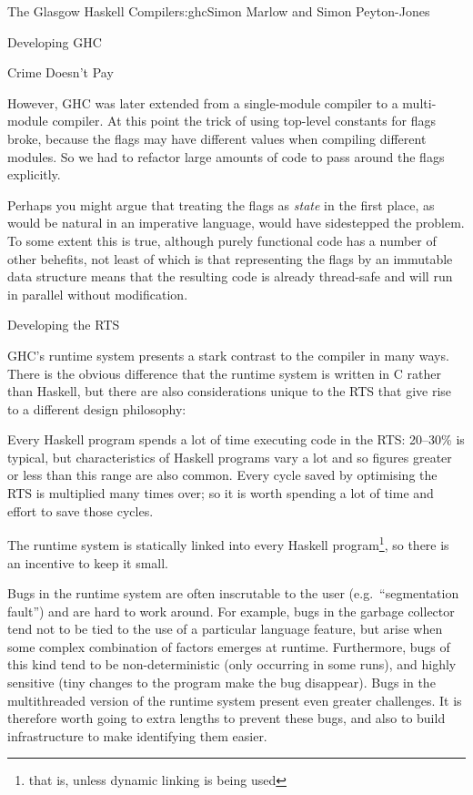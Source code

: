 \begin{aosachapter}{The Glasgow Haskell Compiler}{s:ghc}{Simon Marlow and Simon Peyton-Jones}
\begin{aosasect1}{Developing GHC}
\begin{aosasect2}{Crime Doesn't Pay}
\begin{aosaitemize}
  However, GHC was later extended from a single-module compiler to a
  multi-module compiler.  At this point the trick of using top-level
  constants for flags broke, because the flags may have different
  values when compiling different modules.  So we had to refactor
  large amounts of code to pass around the flags explicitly.

  Perhaps you might argue that treating the flags as \emph{state} in
  the first place, as would be natural in an imperative language,
  would have sidestepped the problem.  To some extent this is true,
  although purely functional code has a number of other behefits, not
  least of which is that representing the flags by an immutable data
  structure means that the resulting code is already thread-safe and
  will run in parallel without modification.

\end{aosaitemize}

\end{aosasect2}

\begin{aosasect2}{Developing the RTS}

GHC's runtime system presents a stark contrast to the compiler in many
ways.  There is the obvious difference that the runtime system is
written in C rather than Haskell, but there are also considerations
unique to the RTS that give rise to a different design philosophy:

\begin{aosaenumerate}

\item Every Haskell program spends a lot of time executing code in the
  RTS: 20--30\% is typical, but characteristics of Haskell programs
  vary a lot and so figures greater or less than this range are also
  common.  Every cycle saved by optimising the RTS is multiplied many
  times over; so it is worth spending a lot of time and effort to save
  those cycles.

\item The runtime system is statically linked into every Haskell
  program\footnote{that is, unless dynamic linking is being used}, so
  there is an incentive to keep it small.

\item Bugs in the runtime system are often inscrutable to the user
  (e.g.\ ``segmentation fault'') and are hard to work around.  For
  example, bugs in the garbage collector tend not to be tied to the
  use of a particular language feature, but arise when some complex
  combination of factors emerges at runtime.  Furthermore, bugs of
  this kind tend to be non-deterministic (only occurring in some
  runs), and highly sensitive (tiny changes to the program make the
  bug disappear).  Bugs in the multithreaded version of the runtime
  system present even greater challenges.  It is therefore worth going
  to extra lengths to prevent these bugs, and also to build
  infrastructure to make identifying them easier.


\end{aosaenumerate}
\end{aosasect2}
\end{aosasect1}
\end{aosachapter}

